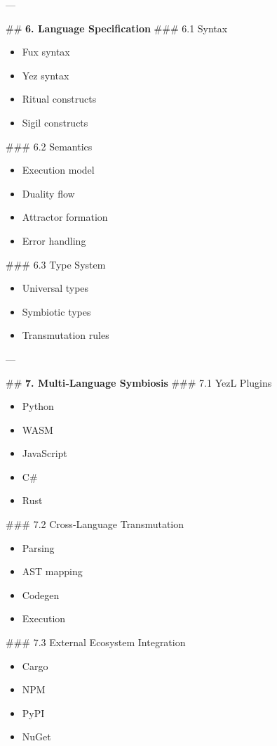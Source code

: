 \documentclass[12pt, a4paper]{book}
\begin{document}
---

\#\# \textbf{6. Language Specification}
\#\#\# 6.1 Syntax  
\begin{itemize}
  \item Fux syntax  
  \item Yez syntax  
  \item Ritual constructs  
  \item Sigil constructs  
\end{itemize}

\#\#\# 6.2 Semantics  
\begin{itemize}
  \item Execution model  
  \item Duality flow  
  \item Attractor formation  
  \item Error handling  
\end{itemize}

\#\#\# 6.3 Type System  
\begin{itemize}
  \item Universal types  
  \item Symbiotic types  
  \item Transmutation rules  
\end{itemize}

---

\#\# \textbf{7. Multi‑Language Symbiosis}
\#\#\# 7.1 YezL Plugins  
\begin{itemize}
  \item Python  
  \item WASM  
  \item JavaScript  
  \item C\#  
  \item Rust  
\end{itemize}

\#\#\# 7.2 Cross‑Language Transmutation  
\begin{itemize}
  \item Parsing  
  \item AST mapping  
  \item Codegen  
  \item Execution  
\end{itemize}

\#\#\# 7.3 External Ecosystem Integration  
\begin{itemize}
  \item Cargo  
  \item NPM  
  \item PyPI  
  \item NuGet  
\end{itemize}
\end{document}
